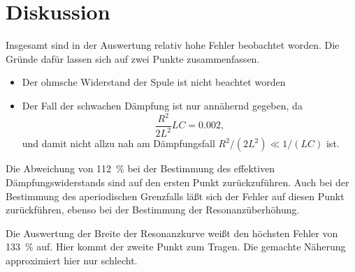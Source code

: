 
\section{Diskussion}

Insgesamt sind in der Auswertung relativ hohe Fehler beobachtet
worden. Die Gründe dafür lassen sich auf zwei Punkte zusammenfassen.
%
\begin{itemize}
\item Der ohmsche Widerstand der Spule ist nicht beachtet worden
\item Der Fall der schwachen Dämpfung ist nur annähernd gegeben, da
  \begin{equation*}
    \frac{R^2}{2 L^2} LC = \num{0.002},
  \end{equation*}
  und damit nicht allzu nah am Dämpfungsfall $R^2/(2L^2) \ll 1/(LC)$
  ist.
\end{itemize}

Die Abweichung von \SI{112}{\percent} bei der Bestimmung des effektiven
Dämpfungswiderstands sind auf den ersten Punkt zurückzuführen. Auch bei
der Bestimmung des aperiodischen Grenzfalls läßt sich der Fehler auf
diesen Punkt zurückführen, ebenso bei der Bestimmung der
Resonanzüberhöhung.

Die Auswertung der Breite der Resonanzkurve weißt den höchsten Fehler
von \SI{133}{\percent} auf. Hier kommt der zweite Punkt zum Tragen. Die
gemachte Näherung approximiert hier nur schlecht.
